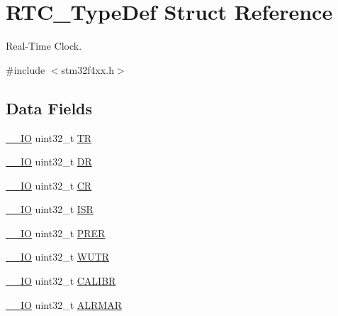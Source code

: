 \hypertarget{struct_r_t_c___type_def}{\section{R\-T\-C\-\_\-\-Type\-Def Struct Reference}
\label{struct_r_t_c___type_def}
}


Real-\/\-Time Clock.  




{\ttfamily \#include $<$stm32f4xx.\-h$>$}

\subsection*{Data Fields}
\begin{DoxyCompactItemize}
\item 
\hyperlink{group___c_m_s_i_s__core__definitions_gaec43007d9998a0a0e01faede4133d6be}{\-\_\-\-\_\-\-I\-O} uint32\-\_\-t \hyperlink{struct_r_t_c___type_def_a63d179b7a36a715dce7203858d3be132}{T\-R}
\item 
\hyperlink{group___c_m_s_i_s__core__definitions_gaec43007d9998a0a0e01faede4133d6be}{\-\_\-\-\_\-\-I\-O} uint32\-\_\-t \hyperlink{struct_r_t_c___type_def_a3df0d8dfcd1ec958659ffe21eb64fa94}{D\-R}
\item 
\hyperlink{group___c_m_s_i_s__core__definitions_gaec43007d9998a0a0e01faede4133d6be}{\-\_\-\-\_\-\-I\-O} uint32\-\_\-t \hyperlink{struct_r_t_c___type_def_ab40c89c59391aaa9d9a8ec011dd0907a}{C\-R}
\item 
\hyperlink{group___c_m_s_i_s__core__definitions_gaec43007d9998a0a0e01faede4133d6be}{\-\_\-\-\_\-\-I\-O} uint32\-\_\-t \hyperlink{struct_r_t_c___type_def_ab3c49a96815fcbee63d95e1e74f20e75}{I\-S\-R}
\item 
\hyperlink{group___c_m_s_i_s__core__definitions_gaec43007d9998a0a0e01faede4133d6be}{\-\_\-\-\_\-\-I\-O} uint32\-\_\-t \hyperlink{struct_r_t_c___type_def_ac9b4c6c5b29f3461ce3f875eea69f35b}{P\-R\-E\-R}
\item 
\hyperlink{group___c_m_s_i_s__core__definitions_gaec43007d9998a0a0e01faede4133d6be}{\-\_\-\-\_\-\-I\-O} uint32\-\_\-t \hyperlink{struct_r_t_c___type_def_ac5b3c8be61045a304d3076d4714d29f2}{W\-U\-T\-R}
\item 
\hyperlink{group___c_m_s_i_s__core__definitions_gaec43007d9998a0a0e01faede4133d6be}{\-\_\-\-\_\-\-I\-O} uint32\-\_\-t \hyperlink{struct_r_t_c___type_def_ab97f3e9584dda705dc10a5f4c5f6e636}{C\-A\-L\-I\-B\-R}
\item 
\hyperlink{group___c_m_s_i_s__core__definitions_gaec43007d9998a0a0e01faede4133d6be}{\-\_\-\-\_\-\-I\-O} uint32\-\_\-t \hyperlink{struct_r_t_c___type_def_ac005b1a5bc52634d5a34578cc9d2c3f6}{A\-L\-R\-M\-A\-R}

\end{DoxyCompactItemize}
